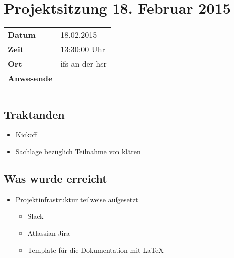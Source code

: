 \documentclass[class=scrbook,crop=false]{standalone}
\begin{document}
	
	\section{Projektsitzung 18. Februar 2015}
	
	\begin{tabular}{ll}
		\textbf{Datum} & 18.02.2015 \\
		\textbf{Zeit} & 13:30\textendash15:00 Uhr \\
		\textbf{Ort} & \acs{ifs} an der \acs{hsr} \\
		\textbf{Anwesende} & \proff \\ & \rlif \\ & \fscf
	\end{tabular}
	
	\subsection*{Traktanden}
	\begin{itemize}
		\item Kickoff
		\item Sachlage bezüglich Teilnahme von \chuf klären
	\end{itemize}
	
	\subsection*{Was wurde erreicht}
	\begin{itemize}
		\item Projektinfrastruktur teilweise aufgesetzt
		\begin{itemize}
			\item Slack
			\item Atlassian Jira
			\item Template für die Dokumentation mit \LaTeX
		\end{itemize}
	\end{itemize}
	
\end{document}
